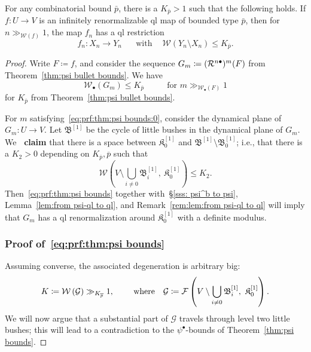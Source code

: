 \documentclass{amsart}
\newcommand{\filled}{{\mathfrak K }}
\newcommand{\bush}{{\mathfrak B }}
\newcommand{\bbush}{{\boldsymbol {\mathfrak B} }}
\renewcommand{\sp}{{\ \ }}
\newcommand{\1}{{\mathbb 1 }}
\newcommand{\Fam}{{\mathcal F}}
\newcommand{\FamG}{{\mathcal G}}
\newcommand{\Width}{{\mathcal W}}
\begin{document}
\begin{thm}
\label{thm:psi bounds}
For any combinatorial bound $\bar p$, there is a $K_{\bar p}>1$ such that the following holds. If $f\colon U\to V$ is an infinitely renormalizable ql map of bounded type $\bar p$, then for $n\gg_{\Width(f)} 1$, the map $f_n$ has a ql restriction
\[ f_n\colon X_n\to Y_n\sp\sp\sp\text{ with }\sp\sp \Width(Y_n\setminus X_n)\le K_{\overline p}.\] 
\end{thm}
\begin{proof}Write $F\coloneqq f$, and consider the sequence $G_m\coloneqq ({\mathcal R}^{n\bullet})^m (F)$ from Theorem~\ref{thm:psi bullet bounds}. We have 
\begin{equation}
\label{eq:prf:thm:psi bounds:0}
\Width_\bullet(G_m)\le K_{\overline p}\hspace{1cm}\text{ for }m\gg_{\Width_\bullet(F)} 1
\end{equation}
for $K_{\overline p}$ from Theorem~\ref{thm:psi bullet bounds}.


For $m$ satisfying~\eqref{eq:prf:thm:psi bounds:0}, consider the dynamical plane of $G_m\colon U\to V$. Let $\bbush^{[1]}$ be the cycle of little bushes in the dynamical plane of $G_m$. We {\bf~claim} that there is a space between $\filled^{[1]}_0$ and $\bbush^{[1]}\setminus \bush^{[1]}_0$; i.e., that there is a $K_2>0$ depending on $K_{\overline p}, \overline p$ such that
\begin{equation}
\label{eq:prf:thm:psi bounds}
\Width\left(V\setminus \bigcup_{i\not= 0} \bush^{[1]}_i,\ \filled^{[1]}_0\right) \le K_2.
\end{equation}
Then~\eqref{eq:prf:thm:psi bounds} together with~\S\ref{sss: psi^b to psi}, Lemma~\ref{lem:from psi-ql to ql}, and Remark~\ref{rem:lem:from psi-ql to ql}
 will imply that $G_m$ has a ql renormalization around $\filled_0^{[1]}$ with a definite modulus. 
 
\subsubsection{Proof of~\eqref{eq:prf:thm:psi bounds}}\label{sss:prf:eq:prf:thm:psi bounds}Assuming converse, the associated degeneration is arbitrary big:
\[ K\coloneqq \Width\left(\FamG\right)\gg_{K_{\overline p}} 1, \hspace{0.7cm}\text{ where }\sp \FamG\coloneqq \Fam\left(V\setminus \bigcup_{i\not= 0} \bush^{[1]}_i,\ \filled^{[1]}_0\right).\]
 We will now argue that a substantial part of $\FamG$ travels through level two little bushes; this will lead to a contradiction to the $\psi^\bullet$-bounds of Theorem~\ref{thm:psi bounds}.
 



\end{proof}
\end{document}
